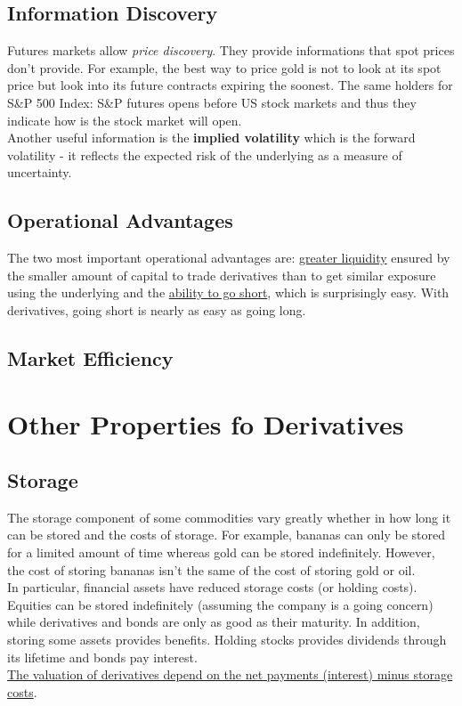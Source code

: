 \documentclass[fleqn,10pt]{SelfArx} %
\begin{document}
\subsection{Information Discovery}

Futures markets allow \textit{price discovery}. They provide informations that spot prices don't provide. For example, the best way to price gold is not to look at its spot price but look into its future contracts expiring the soonest. The same holders for S\&P 500 Index: S\&P futures opens before US stock markets and thus they indicate how is the stock market will open.
\\
Another useful information is the \textbf{implied volatility} which is the forward volatility - it reflects the expected risk of the underlying as a measure of uncertainty.

\subsection{Operational Advantages}

The two most important operational advantages are: \underline{greater liquidity} ensured by the smaller amount of capital to trade derivatives than to get similar exposure using the underlying and the \ul{ability to go short}, which is surprisingly easy. With derivatives, going short is nearly as easy as going long.

\subsection{Market Efficiency}

\newpage
\section{Other Properties fo Derivatives}

\subsection{Storage}

The storage component of some commodities vary greatly whether in how long it can be stored and the costs of storage. For example, bananas can only be stored for a limited amount of time whereas gold can be stored indefinitely. However, the cost of storing bananas isn't the same of the cost of storing gold or oil.
\\
In particular, financial assets have reduced storage costs (or holding costs). Equities can be stored indefinitely (assuming the company is a going concern) while derivatives and bonds are only as good as their maturity. In addition, storing some assets provides benefits. Holding stocks provides dividends through its lifetime and bonds pay interest.
\\
\ul{The valuation of derivatives depend on the net payments (interest) minus storage costs}.
\end{document}
